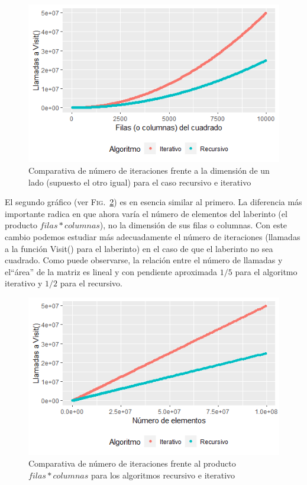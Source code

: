 \documentclass[12pt,a4paper]{article}
\begin{document}
\vspace{0.2cm}
\begin{figure}[h]
	\centering
	\includegraphics[scale=0.9]{fotos/Iteraciones_vs_filas1.png}
	\caption{Comparativa de número de iteraciones frente a la dimensión de un lado (supuesto el otro igual) para el caso recursivo e iterativo}
	\label{grafico1}
\end{figure}

El segundo gráfico (ver \textsc{Fig.}~\ref{grafico2}) es en esencia similar al primero. La diferencia más importante radica en que ahora varía el número de elementos del laberinto (el producto $filas*columnas$), no la dimensión de sus filas o columnas. Con este cambio podemos estudiar más adecuadamente el número de iteraciones (llamadas a la función \textsf{Visit()} para el laberinto) en el caso de que el laberinto no sea cuadrado. Como puede observarse, la relación entre el número de llamadas y el``área'' de la matriz es lineal y con pendiente aproximada $1/5$ para el algoritmo iterativo y $1/2$ para el recursivo.
\begin{figure}[h]
	\centering
	\includegraphics[scale=0.9]{fotos/Iteraciones_vs_numElem1.png}
	\caption{Comparativa de número de iteraciones frente al producto $filas*columnas$ para los algoritmos recursivo e iterativo}
	\label{grafico2}
\end{figure}
\vspace{0.2cm}
\end{document}
